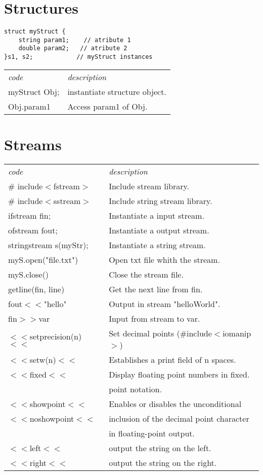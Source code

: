\documentclass[5pt]{article}
\begin{document}
\begin{multicols}{2}
\section{Structures}
\begin{verbatim}
struct myStruct {
    string param1;    // atribute 1
    double param2;   // atribute 2
}s1, s2;            // myStruct instances
\end{verbatim}
\begin{tabular}{ll}
\emph{code}     & \emph{description}\\
myStruct Obj;   & instantiate structure object.\\
Obj.param1      & Access param1 of Obj.\\
\end{tabular}


\section{Streams}
\begin{tabular}{ll}
\emph{code}             & \emph{description}\\
\# include$<$fstream$>$ & Include stream library.\\
\# include$<$sstream$>$ & Include string stream library.\\
ifstream fin;           & Instantiate a input stream.\\
ofstream fout;          & Instantiate a output stream.\\
stringstream s(myStr);  & Instantiate a string stream.\\
myS.open("file.txt")    & Open txt file whith the stream.\\
myS.close()             & Close the stream file.\\
getline(fin, line)      & Get the next line from fin.\\
fout$<<$"hello"         & Output in stream "helloWorld".\\
fin$>>$var              & Input from stream to var.\\
$<<$setprecision(n)$<<$ & Set decimal points (\#include$<$iomanip$>$)\\
$<<$setw(n)$<<$         & Establishes a print field of n spaces.\\
$<<$fixed$<<$           & Display floating point numbers in fixed.\\
                        & point notation.\\
$<<$showpoint$<<$       & Enables or disables the unconditional\\
$<<$noshowpoint$<<$     & inclusion of the decimal point character\\
                        & in floating-point output.\\
$<<$left$<<$            & output the string on the left.\\
$<<$right$<<$            & output the string on the right.\\
\end{tabular}


\end{multicols}
\end{document}
